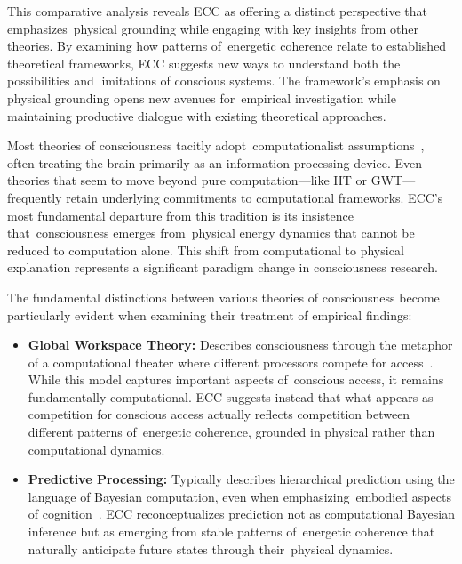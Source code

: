 \begin{refsection}
  This comparative analysis reveals ECC as offering a distinct perspective that emphasizes~physical grounding while engaging with key insights from other theories. By examining how patterns of~energetic coherence relate to established theoretical frameworks, ECC suggests new ways to understand both the possibilities and limitations of conscious systems. The framework's emphasis on physical grounding opens new avenues for~empirical investigation while maintaining productive dialogue with existing theoretical approaches.

  Most theories of consciousness tacitly adopt~computationalist assumptions~\cite{Chalmers2018, putnam1988representation}, often treating the brain primarily as an information-processing device. Even theories that seem to move beyond pure computation—like IIT or GWT—frequently retain underlying commitments to computational frameworks. ECC's most fundamental departure from this tradition is its insistence that~consciousness emerges from~physical energy dynamics that cannot be reduced to computation alone. This shift from computational to physical explanation represents a significant paradigm change in consciousness research.

  The fundamental distinctions between various theories of consciousness become particularly evident when examining their treatment of empirical findings:

  \begin{itemize}
    \item \textbf{Global Workspace Theory:} Describes consciousness through the metaphor of a computational theater where different processors compete for access~\cite{Baars2019, Mashour2020}. While this model captures important aspects of~conscious access, it remains fundamentally computational. ECC suggests instead that what appears as competition for conscious access actually reflects competition between different patterns of~energetic coherence, grounded in physical rather than computational dynamics.

    \item \textbf{Predictive Processing:} Typically describes hierarchical prediction using the language of Bayesian computation, even when emphasizing~embodied aspects of cognition~\cite{Clark2019, Clark2016}. ECC reconceptualizes prediction not as computational Bayesian inference but as emerging from stable patterns of~energetic coherence that naturally anticipate future states through their~physical dynamics.


\end{itemize}
\end{refsection}
